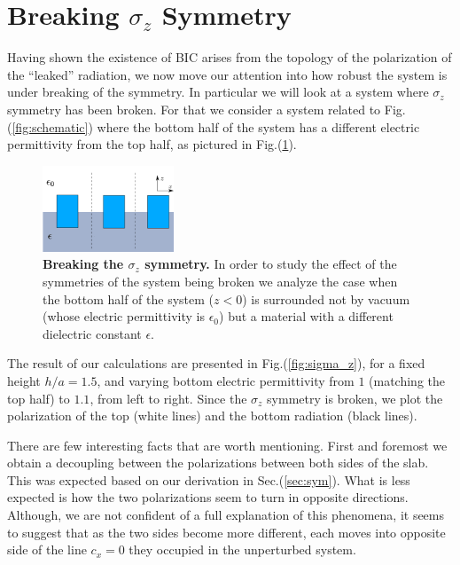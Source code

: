 


\section{Breaking $\sigma_z$ Symmetry}

Having shown the existence of BIC arises from the topology of the polarization of the ``leaked'' radiation, we now move our attention into how robust the system is under breaking of the symmetry. In particular we will look at a system where $\sigma_z$ symmetry has been broken. For that we consider a system related to Fig.(\ref{fig:schematic}) where the bottom half of the system has a different electric permittivity from the top half, as pictured in Fig.(\ref{fig:broken_sym}).

\begin{figure}
\centering
\includegraphics[width=0.35\textwidth]{Figures/broken_symmetry.png}
  \caption{{\bf Breaking the $\sigma_z$ symmetry.} In order to study the effect of the symmetries of the system being broken we analyze the case when the bottom half of the system ($z<0$) is surrounded not by vacuum (whose electric permittivity is $\epsilon_0$) but a material with a different dielectric constant $\epsilon$.}
  \label{fig:broken_sym}
\end{figure}

The result of our calculations are presented in Fig.(\ref{fig:sigma_z}), for a fixed height $h/a = 1.5$, and varying bottom electric permittivity from $1$ (matching the top half) to $1.1$, from left to right. Since the $\sigma_z$ symmetry is broken, we plot the polarization of the top (white lines) and the bottom radiation (black lines).

There are few interesting facts that are worth mentioning. First and foremost we obtain a decoupling between the polarizations between both sides of the slab. This was expected based on our derivation in Sec.(\ref{sec:sym}). What is less expected is how the two polarizations seem to turn in opposite directions. Although, we are not confident of a full explanation of this phenomena, it seems to suggest that as the two sides become more different, each moves into opposite side of the line $c_x=0$ they occupied in the unperturbed system.

